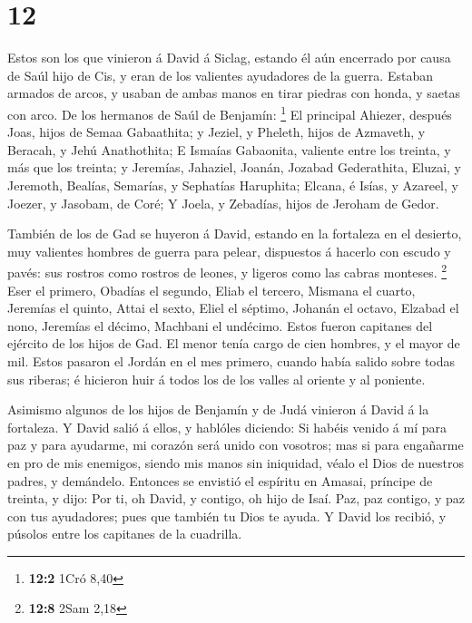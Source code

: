 \hypertarget{section-11}{%
\section{12}\label{section-11}}

 Estos son los que vinieron á David á Siclag, estando él aún
encerrado por causa de Saúl hijo de Cis, y eran de los valientes
ayudadores de la guerra.  Estaban armados de arcos, y usaban
de ambas manos en tirar piedras con honda, y saetas con arco. De los
hermanos de Saúl de Benjamín: \footnote{\textbf{12:2} 1Cró 8,40}
 El principal Ahiezer, después Joas, hijos de Semaa
Gabaathita; y Jeziel, y Pheleth, hijos de Azmaveth, y Beracah, y Jehú
Anathothita;  E Ismaías Gabaonita, valiente entre los
treinta, y más que los treinta; y Jeremías, Jahaziel, Joanán, Jozabad
Gederathita,  Eluzai, y Jeremoth, Bealías, Semarías, y
Sephatías Haruphita;  Elcana, é Isías, y Azareel, y Joezer,
y Jasobam, de Coré;  Y Joela, y Zebadías, hijos de Jeroham
de Gedor.

 También de los de Gad se huyeron á David, estando en la
fortaleza en el desierto, muy valientes hombres de guerra para pelear,
dispuestos á hacerlo con escudo y pavés: sus rostros como rostros de
leones, y ligeros como las cabras monteses. \footnote{\textbf{12:8} 2Sam
  2,18}  Eser el primero, Obadías el segundo, Eliab el
tercero,  Mismana el cuarto, Jeremías el quinto,
 Attai el sexto, Eliel el séptimo,  Johanán el
octavo, Elzabad el nono,  Jeremías el décimo, Machbani el
undécimo.  Estos fueron capitanes del ejército de los hijos
de Gad. El menor tenía cargo de cien hombres, y el mayor de mil.
 Estos pasaron el Jordán en el mes primero, cuando había
salido sobre todas sus riberas; é hicieron huir á todos los de los
valles al oriente y al poniente.

 Asimismo algunos de los hijos de Benjamín y de Judá
vinieron á David á la fortaleza.  Y David salió á ellos, y
hablóles diciendo: Si habéis venido á mí para paz y para ayudarme, mi
corazón será unido con vosotros; mas si para engañarme en pro de mis
enemigos, siendo mis manos sin iniquidad, véalo el Dios de nuestros
padres, y demándelo.  Entonces se envistió el espíritu en
Amasai, príncipe de treinta, y dijo: Por ti, oh David, y contigo, oh
hijo de Isaí. Paz, paz contigo, y paz con tus ayudadores; pues que
también tu Dios te ayuda. Y David los recibió, y púsolos entre los
capitanes de la cuadrilla.

